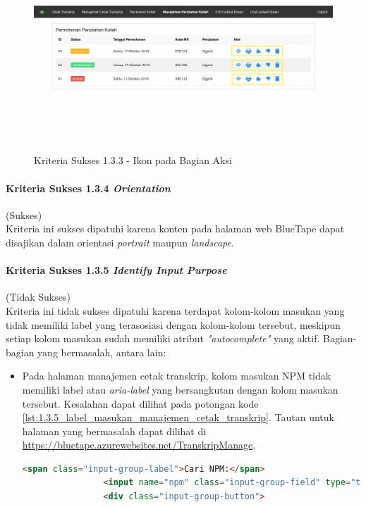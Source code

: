 \documentclass[a4paper,twoside]{article}
\begin{document}
\begin{enumerate}
		\begin{figure}[H]
			\centering  
			\includegraphics[scale=0.3, frame]{kriteria-sukses-1-3-3-sensory-characteristics}  
			\caption[Kriteria Sukses 1.3.3 - Ikon pada Bagian Aksi]{Kriteria Sukses 1.3.3 - Ikon pada Bagian Aksi}
			\label{fig:1.3.3_sensory_characteristics}  
		\end{figure} 

		\paragraph{Kriteria Sukses 1.3.4 \textit{Orientation}}
		\label{par:kepatuhan_bluetape_kriteria_sukses_1.3.4}
		(Sukses)\\

		Kriteria ini sukses dipatuhi karena konten pada halaman web BlueTape dapat disajikan dalam orientasi \textit{portrait} maupun \textit{landscape}.

		\paragraph{Kriteria Sukses 1.3.5 \textit{Identify Input Purpose}}
		\label{par:kepatuhan_bluetape_kriteria_sukses_1.3.5}
		(Tidak Sukses)\\

		Kriteria ini tidak sukses dipatuhi karena terdapat kolom-kolom masukan yang tidak memiliki label yang terasosiasi dengan kolom-kolom tersebut, meskipun setiap kolom masukan sudah memiliki atribut \textit{"autocomplete"} yang aktif. Bagian-bagian yang bermasalah, antara lain:
		\begin{itemize}
			\item Pada halaman manajemen cetak transkrip, kolom masukan NPM tidak memiliki label atau \textit{aria-label} yang bersangkutan dengan kolom masukan tersebut. Kesalahan dapat dilihat pada potongan kode \ref{lst:1.3.5_label_masukan_manajemen_cetak_transkrip}. Tautan untuk halaman yang bermasalah dapat dilihat di \url{https://bluetape.azurewebsites.net/TranskripManage}.
			\begin{lstlisting}[frame=single, label={lst:1.3.5_label_masukan_manajemen_cetak_transkrip}, language=HTML, caption=Kriteria Sukses 1.3.5 - Tidak Terdapat Label pada Kolom Masukan di Halaman Manajemen Cetak Transkrip]
				<span class="input-group-label">Cari NPM:</span>
				<input name="npm" class="input-group-field" type="text" placeholder="2013730013" maxlength="10" minlength="10"/>
				<div class="input-group-button">
			\end{lstlisting}
			

\end{itemize}
\end{enumerate}
\end{document}
